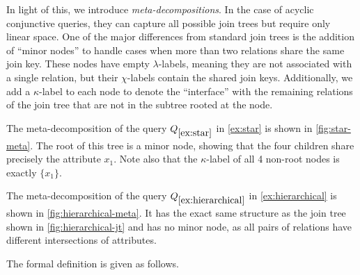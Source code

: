 In light of this, we introduce \emph{meta-decompositions}. In the case of acyclic conjunctive queries, they can capture all possible join trees but require only linear space.
One of the major differences from standard join trees is the addition of ``minor nodes'' to handle cases when more than two relations share the same join key.
These nodes have empty $\lambda$-labels, meaning they are not associated with a single relation, but their $\chi$-labels contain the shared join keys.
Additionally, we add a $\kappa$-label to each node to denote the ``interface'' with the remaining relations of the join tree that are not in the subtree rooted at the node.
\begin{example}
    The meta-decomposition of the query $Q_{\ref{ex:star}}$ in \cref{ex:star} is shown in \cref{fig:star-meta}. The root of this tree is a minor node, showing that the four children share precisely the attribute $x_1$. Note also that the $\kappa$-label of all 4 non-root nodes is exactly $\{ x_1 \}$.
\end{example}
\begin{example}
    The meta-decomposition of the query $Q_{\ref{ex:hierarchical}}$ in \cref{ex:hierarchical} is shown in \cref{fig:hierarchical-meta}. It has the exact same structure as the join tree shown in \cref{fig:hierarchical-jt} and has no minor node, as all pairs of relations have different intersections of attributes.
\end{example}
\begin{figure}
    
    \hfill
    
\end{figure}

The formal definition is given as follows.


